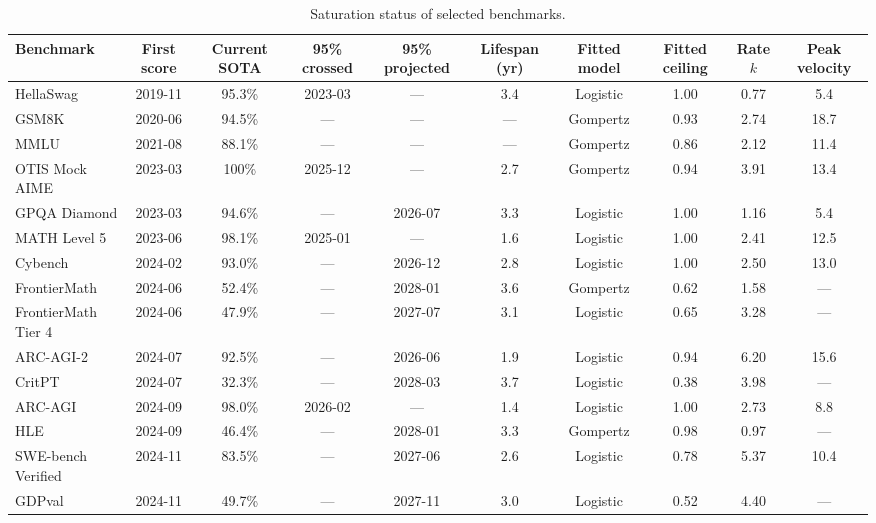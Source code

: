 \begin{table}[t]
\centering
\begin{threeparttable}
\caption{Saturation status of selected benchmarks.}
\label{tab:benchmarks}
{\setlength{\tabcolsep}{4pt}\footnotesize
\begin{tabular}{lccccccccc}
\toprule
Benchmark & First score & Current SOTA & 95\% crossed & 95\% projected & Lifespan (yr) & Fitted model & Fitted ceiling & Rate $k$ & Peak velocity \\
\midrule
HellaSwag            & 2019-11 & 95.3\% & 2023-03 & ---     & 3.4 & Logistic & 1.00 & 0.77 & 5.4  \\
GSM8K                & 2020-06 & 94.5\% & ---     & ---     & --- & Gompertz & 0.93 & 2.74 & 18.7 \\
MMLU                 & 2021-08 & 88.1\% & ---     & ---     & --- & Gompertz & 0.86 & 2.12 & 11.4 \\
OTIS Mock AIME       & 2023-03 & 100\%  & 2025-12 & ---     & 2.7 & Gompertz & 0.94 & 3.91 & 13.4 \\
GPQA Diamond         & 2023-03 & 94.6\% & ---     & 2026-07 & 3.3 & Logistic & 1.00 & 1.16 & 5.4  \\
MATH Level 5         & 2023-06 & 98.1\% & 2025-01 & ---     & 1.6 & Logistic & 1.00 & 2.41 & 12.5 \\
Cybench              & 2024-02 & 93.0\% & ---     & 2026-12 & 2.8 & Logistic & 1.00 & 2.50 & 13.0 \\
FrontierMath         & 2024-06 & 52.4\% & ---     & 2028-01 & 3.6 & Gompertz & 0.62 & 1.58 & ---  \\
FrontierMath Tier 4  & 2024-06 & 47.9\% & ---     & 2027-07 & 3.1 & Logistic & 0.65 & 3.28 & ---  \\
ARC-AGI-2            & 2024-07 & 92.5\% & ---     & 2026-06 & 1.9 & Logistic & 0.94 & 6.20 & 15.6 \\
CritPT               & 2024-07 & 32.3\% & ---     & 2028-03 & 3.7 & Logistic & 0.38 & 3.98 & ---  \\
ARC-AGI              & 2024-09 & 98.0\% & 2026-02 & ---     & 1.4 & Logistic & 1.00 & 2.73 & 8.8  \\
HLE                  & 2024-09 & 46.4\% & ---     & 2028-01 & 3.3 & Gompertz & 0.98 & 0.97 & ---  \\
SWE-bench Verified   & 2024-11 & 83.5\% & ---     & 2027-06 & 2.6 & Logistic & 0.78 & 5.37 & 10.4 \\
GDPval               & 2024-11 & 49.7\% & ---     & 2027-11 & 3.0 & Logistic & 0.52 & 4.40 & ---  \\

\end{tabular}}
\end{threeparttable}
\end{table}

